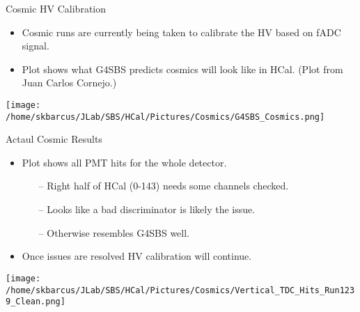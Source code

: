 \documentclass[10pt]{beamer}
\begin{document}
\begin{frame}{Cosmic HV Calibration}

	\begin{itemize}
		\item Cosmic runs are currently being taken to calibrate the HV based on fADC signal.
		\item Plot shows what G4SBS predicts cosmics will look like in HCal. (Plot from Juan Carlos Cornejo.)
	\end{itemize}
	
	\begin{center}
	\texttt{[image: /home/skbarcus/JLab/SBS/HCal/Pictures/Cosmics/G4SBS\_Cosmics.png]}
	\end{center}

\end{frame}

\begin{frame}{Actaul Cosmic Results}

	\begin{itemize}
		\item Plot shows all PMT hits for the whole detector.
		\begin{itemize}
			\item[--] Right half of HCal (0-143) needs some channels checked.
			\item[--] Looks like a bad discriminator is likely the issue.
			\item[--] Otherwise resembles G4SBS well.
		\end{itemize}
		\item Once issues are resolved HV calibration will continue.
	\end{itemize}

	\begin{center}
	\texttt{[image: /home/skbarcus/JLab/SBS/HCal/Pictures/Cosmics/Vertical\_TDC\_Hits\_Run1239\_Clean.png]}
	\end{center}

\end{frame}
\end{document}
